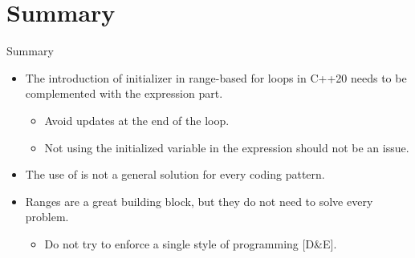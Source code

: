 \section{Summary}

\begin{frame}[t,fragile]{Summary}
\begin{itemize}
  \item The introduction of initializer in range-based for loops in C++20 
        needs to be complemented with the expression part.
    \begin{itemize}
      \item Avoid updates at the end of the loop.
      \item Not using the initialized variable in the expression should not be
            an issue.
    \end{itemize}
  
  \vfill\pause
  \item The use of  is not a general solution for
        every coding pattern.

  \vfill\pause
  \item Ranges are a great building block, but they do not need to solve every
        problem.
    \begin{itemize}
      \item Do not try to enforce a single style of programming [D\&E].
    \end{itemize}
\end{itemize}
\end{frame}
